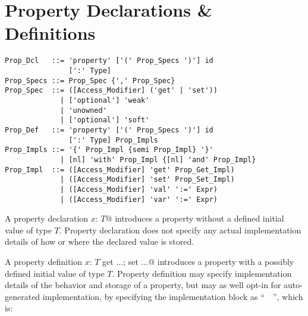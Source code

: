 \section{Property Declarations \& Definitions}
\label{sec:property-dec-dfn}

\syntax\begin{lstlisting}
Prop_Dcl   ::= 'property' ['(' Prop_Specs ')'] id 
               [':' Type]
Prop_Specs ::= Prop_Spec {',' Prop_Spec}
Prop_Spec  ::= ([Access_Modifier] ('get' | 'set')) 
             | ['optional'] 'weak'
             | 'unowned'
             | ['optional'] 'soft'
Prop_Def   ::= 'property' ['(' Prop_Specs ')'] id 
               [':' Type] Prop_Impls
Prop_Impls ::= '{' Prop_Impl {semi Prop_Impl} '}'
             | [nl] 'with' Prop_Impl {[nl] 'and' Prop_Impl}
Prop_Impl  ::= ([Access_Modifier] 'get' Prop_Get_Impl)
             | ([Access_Modifier] 'set' Prop_Set_Impl)
             | ([Access_Modifier] 'val' ':=' Expr)
             | ([Access_Modifier] 'var' ':=' Expr)
\end{lstlisting}

A property declaration \lstinline@property $x$: $T$@ introduces a property without a defined initial value of type $T$. Property declaration does not specify any actual implementation details of how or where the declared value is stored.

A property definition \lstinline@property $x$: $T$ {get $\ldots$; set $\ldots$}@ introduces a property with a possibly defined initial value of type $T$. Property definition may specify implementation details of the behavior and storage of a property, but may as well opt-in for auto-generated implementation, by specifying the implementation block as ``~\code{_}~'', which is: 

